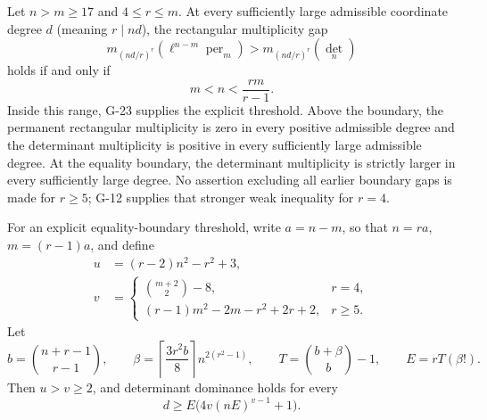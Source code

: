 \begin{theorem}\label{G-24}
Let $n>m\ge17$ and $4\le r\le m$. At every sufficiently
large admissible coordinate degree $d$ (meaning $r\mid nd$),
the rectangular multiplicity gap
\[
 m_{(nd/r)^r}(\ell^{n-m}\operatorname{per}_m)
       >m_{(nd/r)^r}(\det_n)
\]
holds if and only if
\begin{equation}\label{G24:range}
 m<n<\frac{rm}{r-1}.
\end{equation}
Inside this range, G-23 supplies the explicit threshold.
Above the boundary, the permanent rectangular multiplicity
is zero in every positive admissible degree and the determinant
multiplicity is positive in every sufficiently large admissible
degree. At the equality boundary, the determinant multiplicity
is strictly larger in every sufficiently large degree.
No assertion excluding all earlier boundary gaps is made for
$r\ge5$; G-12 supplies that stronger weak inequality for $r=4$.

For an explicit equality-boundary threshold, write
$a=n-m$, so that $n=ra$, $m=(r-1)a$, and define
\[
 \begin{split}
 u&=(r-2)n^2-r^2+3,\\
 v&=\begin{cases}
       \binom{m+2}{2}-8,&r=4,\\
       (r-1)m^2-2m-r^2+2r+2,&r\ge5.
      \end{cases}
 \end{split}
\]
Let
\[
 b=\binom{n+r-1}{r-1},\qquad
 \beta=\left\lceil\frac{3r^2b}{8}\right\rceil n^{2(r^2-1)},
 \qquad T=\binom{b+\beta}{b}-1,\qquad E=rT(\beta!).
\]
Then $u>v\ge2$, and determinant dominance holds for every
\begin{equation}\label{G24:threshold}
 d\ge E\bigl(4v(nE)^{v-1}+1\bigr).
\end{equation}
\end{theorem}

